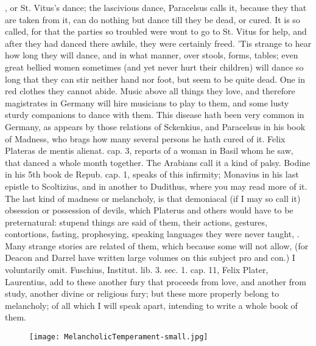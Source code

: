 {, or St. Vitus's dance; the lascivious dance, 
Paracelsus calls it, because they that are taken from it, can do
nothing but dance till they be dead, or cured. It is so called, for
that the parties so troubled were wont to go to St. Vitus for help, and
after they had danced there awhile, they were certainly freed.
'Tis strange to hear how long they will dance, and in what manner, over
stools, forms, tables; even great bellied women sometimes (and yet
never hurt their children) will dance so long that they can stir
neither hand nor foot, but seem to be quite dead. One in red clothes
they cannot abide. Music above all things they love, and therefore
magistrates in Germany will hire musicians to play to them, and some
lusty sturdy companions to dance with them. This disease hath been very
common in Germany, as appears by those relations of Sckenkius, and
Paracelsus in his book of Madness, who brags how many several persons
he hath cured of it. Felix Plateras de mentis alienat. cap. 3, reports
of a woman in Basil whom he saw, that danced a whole month together.
The Arabians call it a kind of palsy. Bodine in his 5th book de Repub.
cap. 1, speaks of this infirmity; Monavius in his last epistle to
Scoltizius, and in another to Dudithus, where you may read more of it.
The last kind of madness or melancholy, is that demoniacal (if I may so
call it) obsession or possession of devils, which Platerus and others
would have to be preternatural: stupend things are said of them, their
actions, gestures, contortions, fasting, prophesying, speaking
languages they were never taught, \etc{}. Many strange stories are related
of them, which because some will not allow, (for Deacon and Darrel have
written large volumes on this subject pro and con.) I voluntarily omit.
Fuschius, Institut. lib. 3. sec. 1. cap. 11, Felix Plater,
Laurentius, add to these another fury that proceeds from love, and
another from study, another divine or religious fury; but these more
properly belong to melancholy; of all which I will speak apart,
intending to write a whole book of them.

\cleartoleftpage{}
\begin{figure}[p]
  \begingroup
  \centering
  \texttt{[image: MelancholicTemperament-small.jpg]}
  \label{fig:melancholictemperament}
\end{figure}

}
